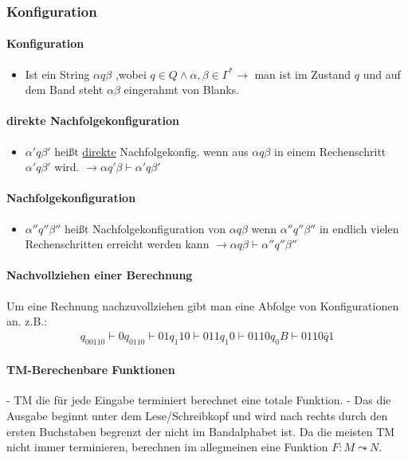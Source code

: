 \documentclass[a4paper, 10pt]{article}
\theoremstyle{definition}
\begin{document}
\subsubsection{Konfiguration}

\paragraph{Konfiguration}
\begin{itemize}
\item Ist ein String $\alpha q\beta$ ,wobei $q\in Q \land \alpha,\beta \in\Gamma^*\to$ man ist im Zustand $q$ und auf dem Band steht $\alpha\beta$ eingerahmt von Blanks.
\end{itemize}
\paragraph{direkte Nachfolgekonfiguration}
\begin{itemize}
\item $\alpha'q\beta'$ heißt \underline{direkte} Nachfolgekonfig. wenn aus $\alpha q\beta$ in  einem Rechenschritt $\alpha'q\beta'$ wird. $\to\alpha q'\beta \vdash \alpha'q\beta'$
\end{itemize}
\paragraph{Nachfolgekonfiguration}
\begin{itemize}
\item $\alpha'' q''\beta''$ heißt Nachfolgekonfiguration von $\alpha q\beta$ wenn $\alpha'' q''\beta''$ in endlich vielen Rechenschritten erreicht werden kann $\to\alpha q\beta \vdash \alpha''q''\beta''$
\end{itemize}
\paragraph{Nachvollziehen einer Berechnung}
Um eine Rechnung nachzuvollziehen gibt man eine Abfolge von Konfigurationen an. z.B.:\begin{align*}
q_00110\vdash 0q_0110\vdash 01q_1 10\vdash 011q_1 0\vdash 0110q_0 B \vdash 0110\bar{q}1 
\end{align*}
\paragraph{TM-Berechenbare Funktionen}
- TM die für jede Eingabe terminiert berechnet eine totale Funktion.
- Das die Ausgabe beginnt unter dem Lese/Schreibkopf und wird nach  rechts durch den ersten Buchstaben begrenzt der nicht im Bandalphabet ist.
Da die meisten TM nicht immer terminieren, berechnen im allegmeinen eine Funktion $F:M\leadsto N$.
\end{document}
